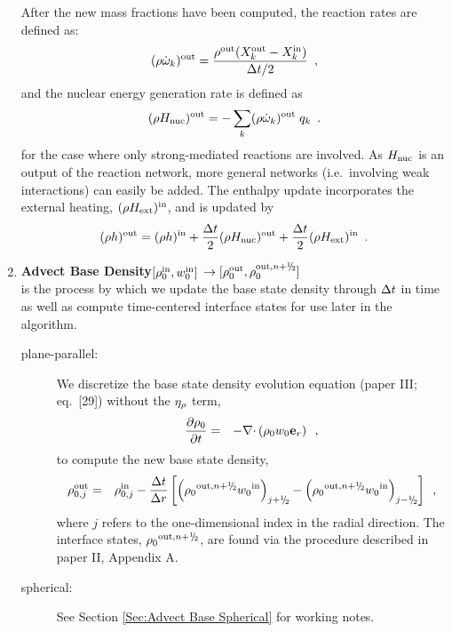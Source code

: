 \begin{enumerate}
After the new mass fractions have been computed, the reaction rates are defined as:
\begin{equation}
(\rho\dot{\omega}_k)^{\mathrm{out}} = \frac{\rho^{\mathrm{out}} ( X_k^{\mathrm{out}} - X_k^{\mathrm{in}})}{\Delta t /2} \enskip,
\end{equation}
and the nuclear energy generation rate is defined as
\begin{equation}
(\rho{H_{\rm nuc}})^{\mathrm{out}} = -\sum_k(\rho\dot{\omega}_k)^{\mathrm{out}} \; q_k \enskip.
\end{equation}
for the case where only strong-mediated reactions are involved.  As
${H_{\rm nuc}}$ is an output of the reaction network, more general networks
(i.e.\ involving weak interactions) can easily be added.  The enthalpy
update incorporates the external heating, $(\rho{H_{\rm ext}})^{\mathrm{in}}$, and is
updated by
\begin{equation}
(\rho h)^{\mathrm{out}} = 
(\rho h)^{\mathrm{in}} + \frac{\Delta t}{2} (\rho{H_{\rm nuc}})^{\mathrm{out}} + \frac{\Delta t}{2} (\rho{H_{\rm ext}})^{\mathrm{in}}\enskip.
\end{equation}

\item {\bf Advect Base Density}$[\rho_0^{\mathrm{in}},w_0^{\mathrm{in}}]$
$\rightarrow [\rho_0^\outp,\rho_0^{\outp,n+\myhalf}]$\\
is the process by which we update the base state density through $\Delta t$ in time
as well as compute time-centered interface states for use later in the algorithm.
\begin{description}

\item[plane-parallel:] We discretize the base state density evolution 
equation (paper III; eq.~[29]) without the $\eta_{\rho}$ term,
\begin{eqnarray}
\frac{\partial \rho_0}{\partial t} &=& - \mathbf{\nabla} \mathbf{\cdot} \left( \rho_0 w_0 \mathbf{e}_r \right)
\enskip ,
\label{eq:rho0upd_new}
\end{eqnarray}
to compute the new base state density,
\begin{eqnarray}
\rho_{0,j}^{\outp} &=& \rho_{0,j}^{\inp} - \frac{\dt}{\dr} 
\left [ \left( {{\rho}_0}^{\outp,\nph} {w_0}^{\inp}\right)_{j+\myhalf} -  
         \left( {{\rho}_0}^{\outp,\nph} {w_0}^{\inp}\right)_{j-\myhalf} \right ]
         \nonumber \enskip,
\end{eqnarray}
where $j$ refers to the one-dimensional index in the radial direction.
The interface states, ${{\rho}_0}^{\outp,\nph}$, are found via the
procedure described in paper II, Appendix A.

\item[spherical:] See Section \ref{Sec:Advect Base Spherical} for working notes.


\end{description}
\end{enumerate}

